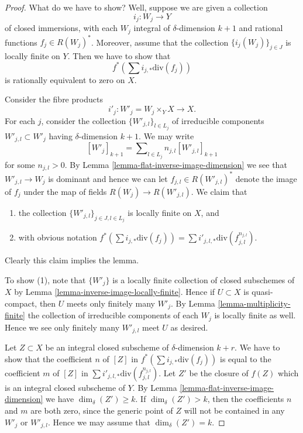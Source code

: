 \begin{proof}
What do we have to show? Well, suppose we are given a collection
$$
i_j : W_j \longrightarrow Y
$$
of closed immersions, with each $W_j$ integral of $\delta$-dimension $k + 1$
and rational functions $f_j \in R(W_j)^*$.
Moreover, assume that
the collection $\{i_j(W_j)\}_{j \in J}$ is locally finite on $Y$.
Then we have to show that
$$
f^*(\sum i_{j, *}\text{div}(f_j))
$$
is rationally equivalent to zero on $X$.

\medskip\noindent
Consider the fibre products
$$
i'_j :
W'_j = W_j \times_Y X
\longrightarrow
X.
$$
For each $j$, consider the collection $\{W'_{j, l}\}_{l \in L_j}$
of irreducible components $W'_{j, l} \subset W'_j$ having $\delta$-dimension
$k + 1$. We may write
$$
[W'_j]_{k + 1} = \sum\nolimits_{l \in L_j} n_{j, l}[W'_{j, l}]_{k + 1}
$$
for some $n_{j, l} > 0$.
By Lemma \ref{lemma-flat-inverse-image-dimension}
we see that $W'_{j, l} \to W_j$ is
dominant and hence we can let $f_{j, l} \in R(W'_{j, l})^*$ denote the
image of $f_j$ under the map of fields $R(W_j) \to R(W'_{j, l})$.
We claim that
\begin{enumerate}
\item the collection $\{W'_{j, l}\}_{j \in J, l \in L_j}$ is
locally finite on $X$, and
\item with obvious notation
$f^*(\sum i_{j, *}\text{div}(f_j))
=
\sum i'_{j, l, *} \text{div}(f_{j, l}^{n_{j, l}})$.
\end{enumerate}
Clearly this claim implies the lemma.

\medskip\noindent
To show (1), note that $\{W'_j\}$ is a locally finite collection
of closed subschemes of $X$ by Lemma \ref{lemma-inverse-image-locally-finite}.
Hence if $U \subset X$ is quasi-compact, then $U$ meets only finitely
many $W'_j$. By Lemma \ref{lemma-multiplicity-finite} the collection of
irreducible components of each $W_j$ is locally finite as well. Hence
we see only finitely many $W'_{j, l}$ meet $U$ as desired.

\medskip\noindent
Let $Z \subset X$ be an integral closed subscheme of $\delta$-dimension
$k + r$. We have to show that the coefficient $n$ of $[Z]$ in
$f^*(\sum i_{j, *}\text{div}(f_j))$ is equal to the coefficient
$m$ of $[Z]$ in $\sum i'_{j, l, *} \text{div}(f_{j, l}^{n_{j, l}})$.
Let $Z'$ be the closure of $f(Z)$ which is an integral closed
subscheme of $Y$. By Lemma \ref{lemma-flat-inverse-image-dimension}
we have $\dim_\delta(Z') \geq k$.
If $\dim_\delta(Z') > k$, then the coefficients $n$ and $m$ are
both zero, since the generic point of $Z$ will not be contained
in any $W'_j$ or $W'_{j, l}$. Hence we may assume that $\dim_\delta(Z') = k$.


\end{proof}

